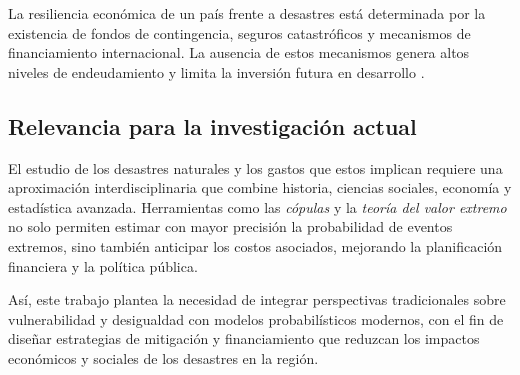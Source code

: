 \documentclass[12pt, a4paper]{article}
\begin{document}
La resiliencia económica de un país frente a desastres está determinada por la existencia de fondos de contingencia, seguros catastróficos y mecanismos de financiamiento internacional. La ausencia de estos mecanismos genera altos niveles de endeudamiento y limita la inversión futura en desarrollo \cite{CentenoMorales2017,OrozcoMontoya2022}.  

\subsection*{Relevancia para la investigación actual}
El estudio de los desastres naturales y los gastos que estos implican requiere una aproximación interdisciplinaria que combine historia, ciencias sociales, economía y estadística avanzada. Herramientas como las \textit{cópulas} y la \textit{teoría del valor extremo} no solo permiten estimar con mayor precisión la probabilidad de eventos extremos, sino también anticipar los costos asociados, mejorando la planificación financiera y la política pública.  

Así, este trabajo plantea la necesidad de integrar perspectivas tradicionales sobre vulnerabilidad y desigualdad con modelos probabilísticos modernos, con el fin de diseñar estrategias de mitigación y financiamiento que reduzcan los impactos económicos y sociales de los desastres en la región.  



\nocite{*}%

\end{document}
